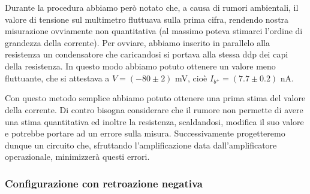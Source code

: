 Durante la procedura abbiamo però notato che, a causa di rumori ambientali, il valore di tensione sul multimetro fluttuava sulla prima cifra, rendendo nostra misurazione ovviamente non quantitativa (al massimo poteva stimarci l'ordine di grandezza della corrente). Per ovviare, abbiamo inserito in parallelo alla resistenza un condensatore che caricandosi si portava alla stessa ddp dei capi della resistenza. In questo modo abbiamo potuto ottenere un valore meno fluttuante, che si attestava a $V=(-80 \pm 2)$ \si{\milli\volt}, cioè $I_{b^+}=(7.7 \pm 0.2)$ \si{\nano\ampere}.

Con questo metodo semplice abbiamo potuto ottenere una prima stima del valore della corrente. Di contro bisogna considerare che il rumore non permette di avere una stima quantitativa ed inoltre la resistenza, scaldandosi, modifica il suo valore e potrebbe portare ad un errore sulla misura. Successivamente progetteremo dunque un circuito che, sfruttando l'amplificazione data dall'amplificatore operazionale, minimizzerà questi errori.

%
%
%
%
%
%

\subsubsection{Configurazione con retroazione negativa}

